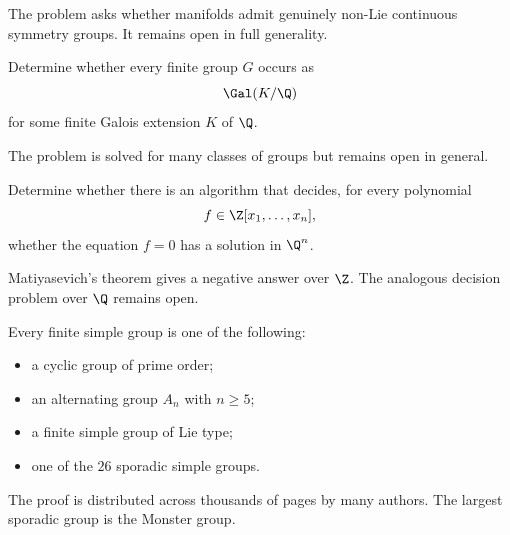     \begin{remark}
        The problem asks whether manifolds admit genuinely non-Lie continuous
        symmetry groups. It remains open in full generality.
    \end{remark}

    \begin{openproblem}
        Determine whether every finite group $G$ occurs as
        \[
            \Gal(K/\Q)
        \]
        for some finite Galois extension $K$ of $\Q$.
    \end{openproblem}

    \begin{remark}
        The problem is solved for many classes of groups but remains open in
        general.
    \end{remark}

    \begin{openproblem}
        Determine whether there is an algorithm that decides, for every
        polynomial
        \[
            f\in\Z[x_1,\dots,x_n],
        \]
        whether the equation $f=0$ has a solution in $\Q^n$.
    \end{openproblem}

    \begin{remark}
        Matiyasevich's theorem gives a negative answer over $\Z$. The analogous
        decision problem over $\Q$ remains open.
    \end{remark}

    \begin{theorem}
        Every finite simple group is one of the following:
        \begin{itemize}
            \item a cyclic group of prime order;
            \item an alternating group $A_n$ with $n\geq 5$;
            \item a finite simple group of Lie type;
            \item one of the $26$ sporadic simple groups.
        \end{itemize}
    \end{theorem}

    \begin{remark}
        The proof is distributed across thousands of pages by many authors.
        The largest sporadic group is the Monster group.
    \end{remark}

